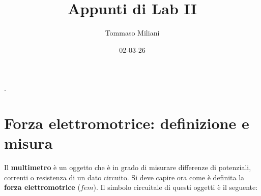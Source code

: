\documentclass[a4paper, oneside]{article}
\title{Appunti di Lab II}
\author{Tommaso Miliani}
\date{02-03-26}
\begin{document}
                {}          %
                {}          %
                {\slshape}  %
                {}          %
                {\bfseries} %
                {.}         %
                {\newline}  %
                {}          %
\theoremstyle{theoremEnv}

\newtheorem{definition}{Definizione}[section]
\newtheorem{theorem}{Teorema}[section]
\newtheorem{lemma}{Proposizione}[section]
\newtheorem{observation}{Osservazione}[section]
\newtheorem{corollary}{Corollario}[theorem]
\newtheorem{example}{Esempio}[section]
\newtheorem{remark}{Enunciato}[section]

\maketitle

\section{Forza elettromotrice: definizione e misura}
Il \textbf{multimetro} è un oggetto che è in grado di misurare differenze di potenziali, 
correnti o resistenza di un dato circuito. Si deve capire ora come è definita la 
\textbf{forza elettromotrice} ($fem$). Il simbolo circuitale di questi oggetti è 
il seguente:
\end{document}
